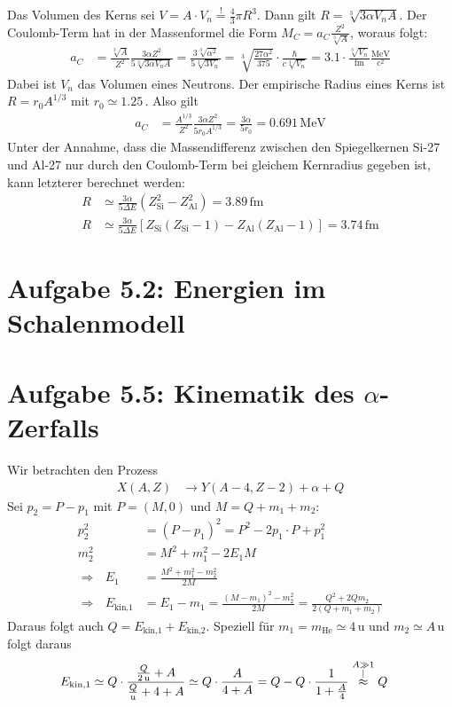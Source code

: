 \documentclass[a4paper,12pt]{article}
\newcommand{\kom}{}
\newcommand{\klam}{}
\newcommand{\tecxt}{}
\begin{document}
Das Volumen des Kerns sei $V=A\cdot V_n\overset{!}{=}\frac{4}{3}\pi R^3$. Dann gilt $R=\sqrt[3]{3\alpha V_nA}$. Der Coulomb-Term hat in der Massenformel die Form $M_C=a_C\frac{Z^2}{\sqrt[3]{A}}$, woraus folgt:
\begin{align*}
a_C&=\frac{\sqrt[3]{A}}{Z^2}\frac{3\alpha Z^2}{5\sqrt[3]{3\alpha V_nA}}=\frac{3\sqrt[3]{\alpha^2}}{5\sqrt[3]{3V_n}}=\sqrt[3]{\frac{27\alpha^2}{375}}\cdot\frac{\hbar}{c\sqrt[3]{V_n}}=3.1\cdot\frac{\sqrt[3]{V_n}}{\tecxt\text{fm}}\frac{\tecxt\text{MeV}}{\tecxt\text{c}^2}
\end{align*}
Dabei ist $V_n$ das Volumen eines Neutrons. Der empirische Radius eines Kerns ist $R=r_0A^{1/3}$ mit $r_0\simeq 1.25\,$. Also gilt
\begin{align*}
a_C&=\frac{A^{1/3}}{Z^2}\frac{3\alpha Z^2}{5r_0A^{1/3}}=\frac{3\alpha}{5r_0}=0.691\,\tecxt\text{MeV}
\end{align*}
Unter der Annahme, dass die Massendifferenz zwischen den Spiegelkernen Si-27 und Al-27 nur durch den Coulomb-Term bei gleichem Kernradius gegeben ist, kann letzterer berechnet werden:
\begin{align*}
R&\simeq\frac{3\alpha}{5\Delta E}(Z_\tecxt\text{Si}^2-Z_\tecxt\text{Al}^2)=3.89\,\tecxt\text{fm}\\
R&\simeq\frac{3\alpha}{5\Delta E}\klam\left[ {Z_\tecxt\text{Si}(Z_\tecxt\text{Si}-1)-Z_\tecxt\text{Al}(Z_\tecxt\text{Al}-1)} \right]=3.74\,\tecxt\text{fm}
\end{align*}
\section*{Aufgabe 5.2: Energien im Schalenmodell}
\section*{Aufgabe 5.5: Kinematik des $\alpha$-Zerfalls}
Wir betrachten den Prozess
\begin{align*}
X(A,Z)&\longrightarrow Y(A-4,Z-2)+\alpha+Q
\end{align*}
Sei $p_2=P-p_1$ mit $P=(M,0)$ und $M=Q+m_1+m_2$:
\begin{align*}
p_2^2&=(P-p_1)^2=P^2-2p_1\cdot P+p_1^2\\
m_2^2&=M^2+m_1^2-2E_1M\\
\Rightarrow\ \ \ E_1&=\frac{M^2+m_1^2-m_2^2}{2M}\\
\Rightarrow\ \ \ E_\tecxt\text{kin,1}&=E_1-m_1=\frac{(M-m_1)^2-m_2^2}{2M}=\frac{Q^2+2Qm_2}{2(Q+m_1+m_2)}
\end{align*}
Daraus folgt auch $Q=E_\tecxt\text{kin,1}+E_\tecxt\text{kin,2}$. Speziell für $m_1=m_\tecxt\text{He}\simeq 4\,$u und $m_2\simeq A\,$u folgt daraus
\begin{align*}
E_\tecxt\text{kin,1}&\simeq Q\cdot\frac{\frac{Q}{\tecxt\text{2\,u}}+A}{\frac{Q}{\tecxt\text{u}}+4+A}\simeq Q\cdot\frac{A}{4+A}=Q-Q\cdot\frac{1}{1+\frac{A}{4}}\kom\overset{\substack{{A\gg 1} \\ |}}{\approx} Q
\end{align*}
\end{document}
